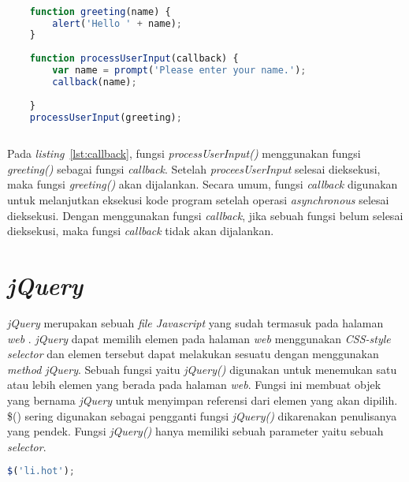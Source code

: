 \begin{lstlisting}[language=Javascript, caption=Contoh fungsi \textit{callback}, label={lst:callback}]

	function greeting(name) {
  		alert('Hello ' + name);
	}
	
	function processUserInput(callback) {
  		var name = prompt('Please enter your name.');
  		callback(name);
	
	}
	processUserInput(greeting);
	
\end{lstlisting}

Pada \textit{listing}~\ref{lst:callback}, fungsi \textit{processUserInput()} menggunakan fungsi \textit{greeting()} sebagai fungsi \textit{callback}. Setelah \textit{proceesUserInput} selesai dieksekusi, maka fungsi \textit{greeting()} akan dijalankan. Secara umum, fungsi \textit{callback} digunakan untuk melanjutkan eksekusi kode program setelah operasi \textit{asynchronous} selesai dieksekusi. Dengan menggunakan fungsi \textit{callback}, jika sebuah fungsi belum selesai dieksekusi, maka fungsi \textit{callback} tidak akan dijalankan.

\section{\textit{jQuery}}
\textit{jQuery} merupakan sebuah \textit{file Javascript} yang sudah termasuk pada halaman \textit{web} \cite{duckett2014javascript}. \textit{jQuery} dapat memilih elemen pada halaman \textit{web} menggunakan \textit{CSS-style selector} dan elemen tersebut dapat melakukan sesuatu dengan menggunakan \textit{method jQuery}. Sebuah fungsi yaitu \textit{jQuery()} digunakan untuk menemukan satu atau lebih elemen yang berada pada halaman \textit{web}. Fungsi ini membuat objek yang bernama \textit{jQuery} untuk menyimpan referensi dari elemen yang akan dipilih. \$() sering digunakan sebagai pengganti fungsi \textit{jQuery()} dikarenakan penulisanya yang pendek. Fungsi \textit{jQuery()} hanya memiliki sebuah parameter yaitu sebuah \textit{selector}.

\begin{lstlisting}[language=Javascript, caption=Mendapatkan elemen menggunakan \textit{CSS-style selector}, label={lst:jQuery1}]
	$('li.hot');
\end{lstlisting}

